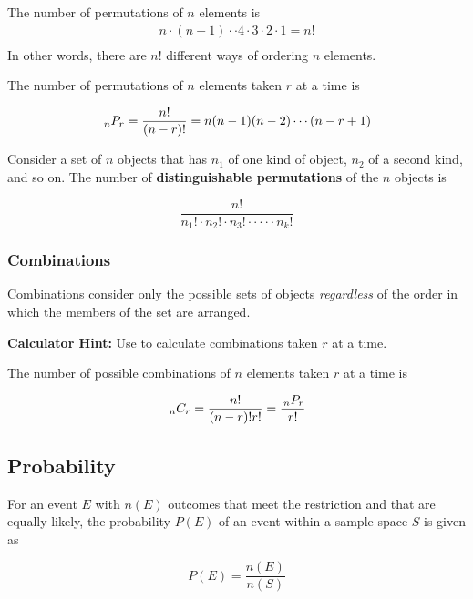 The number of permutations of \(n\) elements is
\[
	\begin{array}{l}{n \cdot(n-1) \cdot \cdot 4 \cdot 3 \cdot 2 \cdot 1=n !} \\ \end{array}
\]
In other words, there are \( n! \) different ways of ordering \(n\) elements.


The number of permutations of \(n\) elements taken \(r\) at a time is

\[
	\,_{n}P_{r}=\frac{n !}{(n-r) !}=n(n-1)(n-2) \cdots(n-r+1)
\]

Consider a set of \(n\) objects that has \(n_1\) of one kind of object, \(n_2\) of a second kind, and so on. The number of \textbf{distinguishable permutations} of the \(n\) objects is

\begin{equation}
	\frac{n !}{n_{1} ! \cdot n_{2} ! \cdot n_{3} ! \cdot \cdot \cdot \cdot \cdot n_{k} !}
\end{equation}

\subsubsection{Combinations}

Combinations consider only the possible sets of objects \emph{regardless} of the order in which the members of the set are arranged.

\begin{mdframed}
\textbf{Calculator Hint:} Use  to calculate combinations taken \(r\) at a time.
\end{mdframed}

The number of possible combinations of \(n\) elements taken \(r\) at a time is

\begin{equation}
	\,_{n}C_{r}=\frac{n !}{(n-r) ! r !} = \frac{\,_{n}P_{r}}{r!}
\end{equation}

\subsection{Probability}
For an event \(E\) with \(n(E)\) outcomes that meet the restriction and that are equally likely, the probability \(P(E)\) of an event within a sample space \(S\) is given as

\begin{equation}
	P(E)=\frac{n(E)}{n(S)}
\end{equation}

